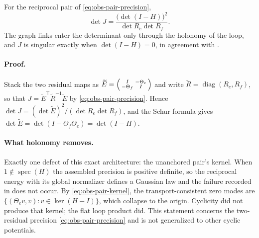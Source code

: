 For the reciprocal pair of \eqref{eq:obs-pair-precision},
\begin{equation}
\det J=\frac{\bigl(\det(I-H)\bigr)^{2}}{\det R_e\det R_f} .
\label{eq:obs-holonomy-det}
\end{equation}
The graph links enter the determinant only through the holonomy of the loop,
and $J$ is singular exactly when $\det(I-H)=0$, in agreement with
.

\paragraph{Proof.}
Stack the two residual maps as
\(\widetilde E=\begin{psmallmatrix}I&-\Theta_e\\-\Theta_f&I\end{psmallmatrix}\)
and write \(\widetilde R=\operatorname{diag}(R_e,R_f)\), so that
\(J=\widetilde E^{\top}\widetilde R^{-1}\widetilde E\) by
\eqref{eq:obs-pair-precision}. Hence
\(\det J=(\det\widetilde E)^2/(\det R_e\det R_f)\), and the Schur formula
gives
\(\det\widetilde E=\det(I-\Theta_f\Theta_e)=\det(I-H)\).

\paragraph{What holonomy removes.}
Exactly one defect of this exact architecture: the unanchored pair's kernel. When $1\notin\operatorname{spec}(H)$ the assembled precision is positive definite, so the reciprocal energy with its global normalizer defines a Gaussian law and the failure recorded in  does not occur. By \eqref{eq:obs-pair-kernel}, the transport-consistent zero modes are
\(\{(\Theta_ev,v):v\in\ker(H-I)\}\), which collapse to the origin. Cyclicity did not produce that kernel; the flat loop product did. This statement concerns the two-residual precision \eqref{eq:obs-pair-precision} and is not generalized to other cyclic potentials. 


